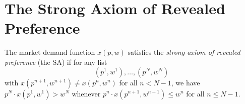 \section{The Strong Axiom of Revealed Preference}

\begin{defn}
    The market demand function $x(p, w)$ satisfies the \emph{strong axiom of revealed preference} (the SA) if for any list
    \begin{equation*}
        (p^1, w^1), \dots, (p^N, w^N)
    \end{equation*}
    with $x(p^{n + 1}, w^{n + 1}) \neq x(p^n, w^n)$ for all $n < N - 1$, we have $p^N \cdot x(p^1, w^1) > w^N$ whenever $p^n \cdot x(p^{n + 1}, w^{n + 1}) \leq w^n$ for all $n \leq N - 1$.
\end{defn}
